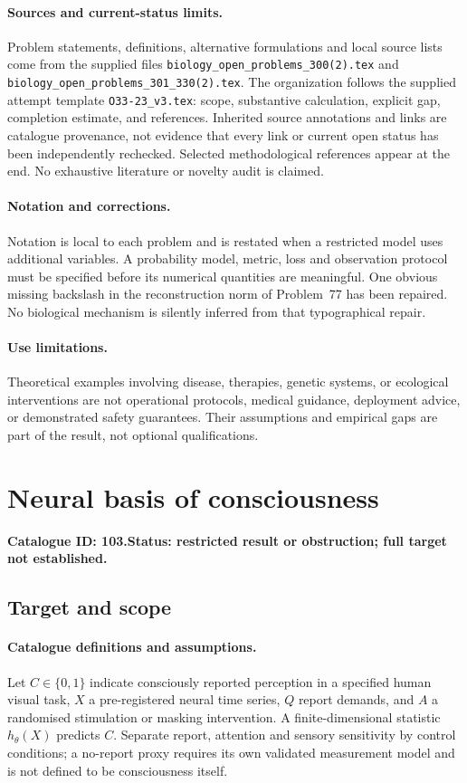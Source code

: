 \documentclass[11pt]{article}
\begin{document}
\paragraph{Sources and current-status limits.}
Problem statements, definitions, alternative formulations and local source lists
come from the supplied files
\texttt{biology\_open\_problems\_300(2).tex} and
\texttt{biology\_open\_problems\_301\_330(2).tex}.
The organization follows the supplied attempt template
\texttt{O33-23\_v3.tex}: scope, substantive calculation, explicit gap,
completion estimate, and references. Inherited source annotations and links are
catalogue provenance, not evidence that every link or current open status has
been independently rechecked. Selected methodological references appear at the
end. No exhaustive literature or novelty audit is claimed.

\paragraph{Notation and corrections.}
Notation is local to each problem and is restated when a restricted model uses
additional variables. A probability model, metric, loss and observation protocol
must be specified before its numerical quantities are meaningful. One obvious
missing backslash in the reconstruction norm of Problem~77 has been repaired.
No biological mechanism is silently inferred from that typographical repair.

\paragraph{Use limitations.}
Theoretical examples involving disease, therapies, genetic systems, or ecological
interventions are not operational protocols, medical guidance, deployment advice,
or demonstrated safety guarantees. Their assumptions and empirical gaps are part
of the result, not optional qualifications.

\setcounter{section}{102}
\section{Neural basis of consciousness}
\label{prob:103}
\noindent\textbf{Catalogue ID: 103.}\quad \textbf{Status: restricted result or obstruction; full target not established.}
\subsection{Target and scope}
\paragraph{Catalogue definitions and assumptions.}
Let $C\in\{0,1\}$ indicate consciously reported perception in a specified human visual task, $X$ a pre-registered neural time series, $Q$ report demands, and $A$ a randomised stimulation or masking intervention. A finite-dimensional statistic $h_\theta(X)$ predicts $C$. Separate report, attention and sensory sensitivity by control conditions; a no-report proxy requires its own validated measurement model and is not defined to be consciousness itself.
\end{document}
